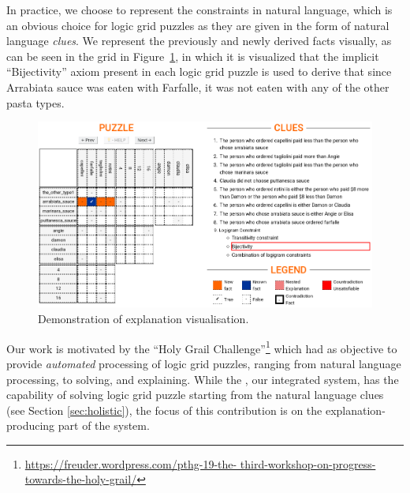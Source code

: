 In practice, we choose to represent the constraints in natural language, which is an obvious choice for logic grid puzzles as they are given in the form of natural language \textit{clues}. 
We represent the previously and newly derived facts visually, as can be seen in the grid in Figure~\ref{fig:zebrascreen}, in which it is visualized that the implicit ``Bijectivity'' axiom present in each logic grid puzzle is used to derive that since Arrabiata sauce was eaten with Farfalle, it was not eaten with any of the other pasta types.

\begin{figure}[ht]
\centering
\includegraphics[width=0.9\linewidth]{figures/zebra_screen_1}
\caption{Demonstration of explanation visualisation.}
\label{fig:zebrascreen}
\end{figure}

Our work is motivated by the ``Holy Grail Challenge''\footnote{\url{https://freuder.wordpress.com/pthg-19-the- third-workshop-on-progress-towards-the-holy-grail/}} which had as objective to provide \textit{automated} processing of logic grid puzzles, ranging from natural language processing, to solving, and explaining.
While the \ourtool, our integrated system, has the capability of solving logic grid puzzle starting from the natural language clues (see Section \ref{sec:holistic}), the focus of this contribution is on the explanation-producing part of the system.

